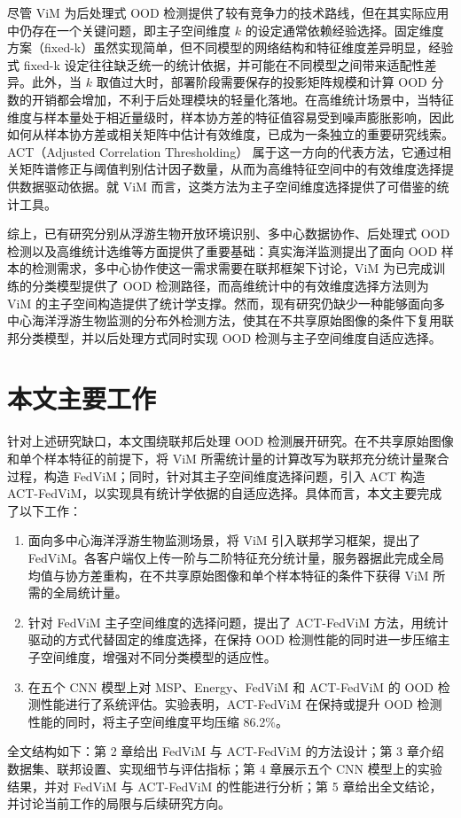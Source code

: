 尽管 ViM 为后处理式 OOD 检测提供了较有竞争力的技术路线，但在其实际应用中仍存在一个关键问题，即主子空间维度 $k$ 的设定通常依赖经验选择\cite{wang2022vim}。固定维度方案（fixed-k）虽然实现简单，但不同模型的网络结构和特征维度差异明显，经验式 fixed-k 设定往往缺乏统一的统计依据，并可能在不同模型之间带来适配性差异。此外，当 $k$ 取值过大时，部署阶段需要保存的投影矩阵规模和计算 OOD 分数的开销都会增加，不利于后处理模块的轻量化落地。在高维统计场景中，当特征维度与样本量处于相近量级时，样本协方差的特征值容易受到噪声膨胀影响，因此如何从样本协方差或相关矩阵中估计有效维度，已成为一条独立的重要研究线索。ACT（Adjusted Correlation Thresholding）\cite{fan2022act} 属于这一方向的代表方法，它通过相关矩阵谱修正与阈值判别估计因子数量，从而为高维特征空间中的有效维度选择提供数据驱动依据。就 ViM 而言，这类方法为主子空间维度选择提供了可借鉴的统计工具。

综上，已有研究分别从浮游生物开放环境识别、多中心数据协作、后处理式 OOD 检测以及高维统计选维等方面提供了重要基础：真实海洋监测提出了面向 OOD 样本的检测需求，多中心协作使这一需求需要在联邦框架下讨论，ViM 为已完成训练的分类模型提供了 OOD 检测路径，而高维统计中的有效维度选择方法则为 ViM 的主子空间构造提供了统计学支撑。然而，现有研究仍缺少一种能够面向多中心海洋浮游生物监测的分布外检测方法，使其在不共享原始图像的条件下复用联邦分类模型，并以后处理方式同时实现 OOD 检测与主子空间维度自适应选择。

\section{本文主要工作}

针对上述研究缺口，本文围绕联邦后处理 OOD 检测展开研究。在不共享原始图像和单个样本特征的前提下，将 ViM 所需统计量的计算改写为联邦充分统计量聚合过程，构造 FedViM；同时，针对其主子空间维度选择问题，引入 ACT 构造 ACT-FedViM，以实现具有统计学依据的自适应选择。具体而言，本文主要完成了以下工作：

\begin{enumerate}
  \item 面向多中心海洋浮游生物监测场景，将 ViM 引入联邦学习框架，提出了 FedViM。各客户端仅上传一阶与二阶特征充分统计量，服务器据此完成全局均值与协方差重构，在不共享原始图像和单个样本特征的条件下获得 ViM 所需的全局统计量。
  \item 针对 FedViM 主子空间维度的选择问题，提出了 ACT-FedViM 方法，用统计驱动的方式代替固定的维度选择，在保持 OOD 检测性能的同时进一步压缩主子空间维度，增强对不同分类模型的适应性。
  \item 在五个 CNN 模型上对 MSP、Energy、FedViM 和 ACT-FedViM 的 OOD 检测性能进行了系统评估。实验表明，ACT-FedViM 在保持或提升 OOD 检测性能的同时，将主子空间维度平均压缩 86.2\%。
\end{enumerate}

全文结构如下：第 2 章给出 FedViM 与 ACT-FedViM 的方法设计；第 3 章介绍数据集、联邦设置、实现细节与评估指标；第 4 章展示五个 CNN 模型上的实验结果，并对 FedViM 与 ACT-FedViM 的性能进行分析；第 5 章给出全文结论，并讨论当前工作的局限与后续研究方向。
